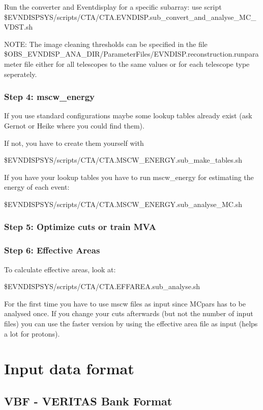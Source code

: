 \documentclass[titlepage,a4paper,twoside,11pt]{report}
\begin{document}
Run the converter and Eventdisplay for a specific subarray: use script \$EVNDISPSYS/scripts/CTA/CTA.EVNDISP.sub\_convert\_and\_analyse\_MC\_VDST.sh

NOTE: The image cleaning thresholds can be specified in the file \$OBS\_EVNDISP\_ANA\_DIR/ParameterFiles/EVNDISP.reconstruction.runparameter file either
for all telescopes to the same values or for each telescope type seperately. 

\subsection{Step 4: mscw\_energy}

If you use standard configurations maybe some lookup tables already exist (ask Gernot or Heike where you could find them).

If not, you have to create them yourself with

\$EVNDISPSYS/scripts/CTA/CTA.MSCW\_ENERGY.sub\_make\_tables.sh

If you have your lookup tables you have to run mscw\_energy for estimating the energy of each event: 

\$EVNDISPSYS/scripts/CTA/CTA.MSCW\_ENERGY.sub\_analyse\_MC.sh

\subsection{Step 5: Optimize cuts or train MVA}

\subsection{Step 6: Effective Areas}

To calculate effective areas, look at:

\$EVNDISPSYS/scripts/CTA/CTA.EFFAREA.sub\_analyse.sh

For the first time you have to use mscw files as input since MCpars has to be analysed once. 
If you change your cuts afterwards (but not the number of input files) you can use the faster version by using
the effective area file as input (helps a lot for protons).

\chapter{Input data format}

\section{VBF - VERITAS Bank Format}
\end{document}
